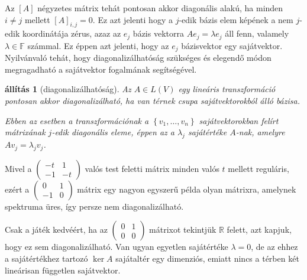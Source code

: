 \documentclass[9pt, a4paper, showtrims]{memoir}
\theoremstyle{plain}
\newtheorem{proposition}{állítás}[chapter]
\theoremstyle{remark}
\theoremstyle{definition}
\begin{document}
    Az $\left[ A \right]$ négyzetes mátrix tehát pontosan akkor diagonális alakú, 
    ha minden $i\neq j$ mellett $\left[ A \right]_{i,j}=0.$
    Ez azt jelenti hogy a $j$-edik bázis elem képének a nem $j$-edik koordinátája zérus,
    azaz az $e_j$ bázis vektorra $Ae_j=\lambda e_j$ áll fenn,
    valamely $\lambda\in\mathbb{F}$ számmal.
    Ez éppen azt jelenti, 
    hogy az $e_j$ bázisvektor egy sajátvektor.
    Nyilvánvaló tehát, 
    hogy diagonalizálhatóság szükséges és elegendő módon megragadható a sajátvektor fogalmának segítségével.
    \begin{proposition}[diagonalizálhatóság]
        Az $A\in L\left( V \right)$ egy lineáris transzformáció
        pontosan akkor diagonalizálható,
        ha van térnek csupa sajátvektorokból álló bázisa.

        Ebben az esetben a transzformációnak a $\left\{ v_1,\dots,v_n \right\}$ sajátvektorokban felírt mátrixának
        $j$-edik diagonális eleme, 
        éppen az a $\lambda_j$ sajátértéke $A$-nak,
        amelyre $Av_j=\lambda_jv_j$.
    \end{proposition}
    Mivel a 
    \begin{math}
        \begin{pmatrix}
            -t&1\\-1&-t
        \end{pmatrix}
    \end{math}
    valós test feletti mátrix minden valós $t$ mellett reguláris, 
    ezért a 
    \begin{math}
        \begin{pmatrix}
            0&1\\-1&0
        \end{pmatrix}
    \end{math}
    mátrix egy nagyon egyszerű példa olyan mátrixra, amelynek spektruma üres,
    így persze nem diagonalizálható.

    Csak a játék kedvéért, ha az
    \begin{math}
        \begin{pmatrix}
            0&1\\0&0
        \end{pmatrix}
    \end{math}
    mátrixot tekintjük $\mathbb{R}$ felett, 
    azt kapjuk, hogy ez sem diagonalizálható.
    Van ugyan egyetlen sajátértéke $\lambda=0$,
    de az ehhez a sajátértékhez tartozó $\ker A$ sajátaltér egy dimenziós,
    emiatt nincs a térben két lineárisan független sajátvektor.
\end{document}

